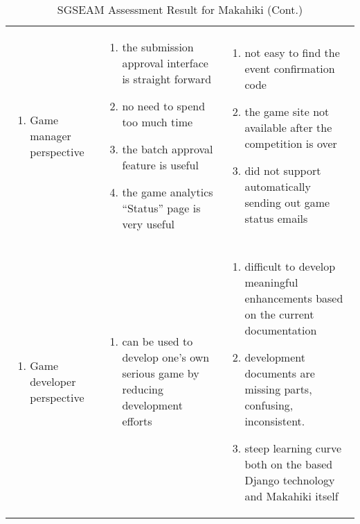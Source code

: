 \begin{table}[ht!]
  
  \begin{tabular}{|P{0.17\columnwidth}|P{0.33\columnwidth}|P{0.4\columnwidth}|}
    \hline
     &
     &
     \\
    \hline
    \begin{enumerate}[label={}, nosep, leftmargin=*]
    \item Game manager perspective 
    \end{enumerate}
    & 
    \begin{enumerate}[nosep, leftmargin=*]
    \item the submission approval interface is straight forward 
    \item no need to spend too much time 
    \item the batch approval feature is useful 
    \item the game analytics ``Status'' page is very useful
    \end{enumerate} 
    & 
    \begin{enumerate}[nosep, leftmargin=*]
    \item not easy to find the event confirmation code 
    \item the game site not available after the competition is over
    \item did not support automatically sending out game status emails 
    \end{enumerate}  \\
    \hline
    \begin{enumerate}[label={}, nosep, leftmargin=*]
    \item Game developer perspective
    \end{enumerate}
    & 
    \begin{enumerate}[label={}, nosep, leftmargin=*]
    \item can be used to develop one's own serious game by reducing development efforts 
    \end{enumerate} 
    & 
    \begin{enumerate}[nosep, leftmargin=*]
    \item difficult to develop meaningful enhancements based on the current documentation
    \item development documents are missing parts, confusing, inconsistent.
    \item steep learning curve both on the based Django technology and Makahiki itself 
    \end{enumerate} \\
    \hline
  \end{tabular}
  \caption{SGSEAM Assessment Result for Makahiki (Cont.)}
  \label{table:assessment-result2}
\end{table}


